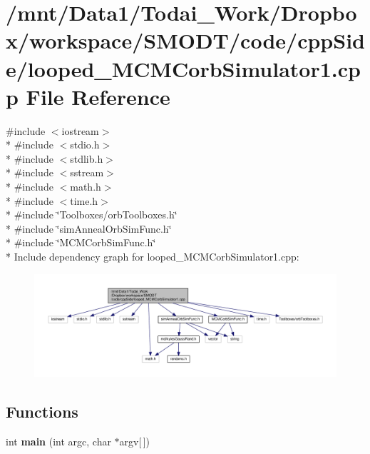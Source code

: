 \section{/mnt/\-Data1/\-Todai\-\_\-\-Work/\-Dropbox/workspace/\-S\-M\-O\-D\-T/code/cpp\-Side/looped\-\_\-\-M\-C\-M\-Corb\-Simulator1.cpp File Reference}
\label{looped___m_c_m_corb_simulator1_8cpp}
{\ttfamily \#include $<$iostream$>$}\\*
{\ttfamily \#include $<$stdio.\-h$>$}\\*
{\ttfamily \#include $<$stdlib.\-h$>$}\\*
{\ttfamily \#include $<$sstream$>$}\\*
{\ttfamily \#include $<$math.\-h$>$}\\*
{\ttfamily \#include $<$time.\-h$>$}\\*
{\ttfamily \#include \char`\"{}Toolboxes/orb\-Toolboxes.\-h\char`\"{}}\\*
{\ttfamily \#include \char`\"{}sim\-Anneal\-Orb\-Sim\-Func.\-h\char`\"{}}\\*
{\ttfamily \#include \char`\"{}M\-C\-M\-Corb\-Sim\-Func.\-h\char`\"{}}\\*
Include dependency graph for looped\-\_\-\-M\-C\-M\-Corb\-Simulator1.\-cpp\-:\nopagebreak
\begin{figure}[H]
\begin{center}
\leavevmode
\includegraphics[width=350pt]{looped___m_c_m_corb_simulator1_8cpp__incl}
\end{center}
\end{figure}
\subsection*{Functions}
\begin{DoxyCompactItemize}
\item 
int {\bf main} (int argc, char $\ast$argv[$\,$])
\end{DoxyCompactItemize}


